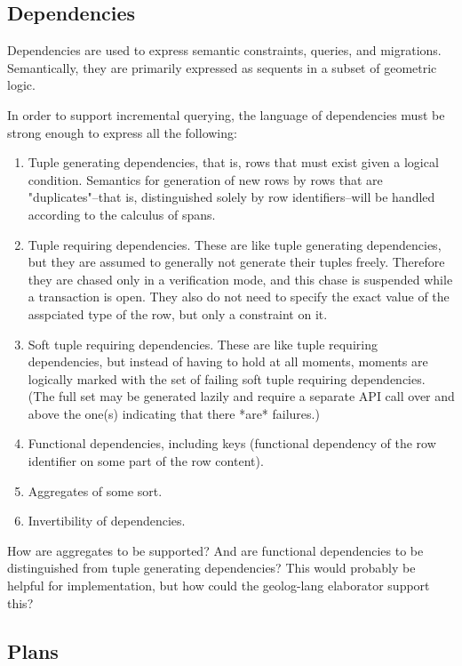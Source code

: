 \documentclass{article}
\begin{document}
\subsection{Dependencies}

Dependencies are used to express semantic constraints, queries, and migrations.  Semantically, they are primarily expressed as sequents in a subset of geometric logic.

In order to support incremental querying, the language of dependencies must be strong enough to express all the following:
\begin{enumerate}
\item Tuple generating dependencies, that is, rows that must exist given a logical condition.  Semantics for generation of new rows by rows that are "duplicates"--that is, distinguished solely by row identifiers--will be handled according to the calculus of spans.
\item Tuple requiring dependencies.  These are like tuple generating dependencies, but they are assumed to generally not generate their tuples freely.  Therefore they are chased only in a verification mode, and this chase is suspended while a transaction is open.  They also do not need to specify the exact value of the asspciated type of the row, but only a constraint on it.
\item Soft tuple requiring dependencies.  These are like tuple requiring dependencies, but instead of having to hold at all moments, moments are logically marked with the set of failing soft tuple requiring dependencies.  (The full set may be generated lazily and require a separate API call over and above the one(s) indicating that there *are* failures.)
\item Functional dependencies, including keys (functional dependency of the row identifier on some part of the row content).
\item Aggregates of some sort.
\item Invertibility of dependencies.
\end{enumerate}

\begin{question}
	How are aggregates to be supported?  And are functional dependencies to be distinguished from tuple generating dependencies?  This would probably be helpful for implementation, but how could the geolog-lang elaborator support this?
\end{question}

\subsection{Plans}
\end{document}
